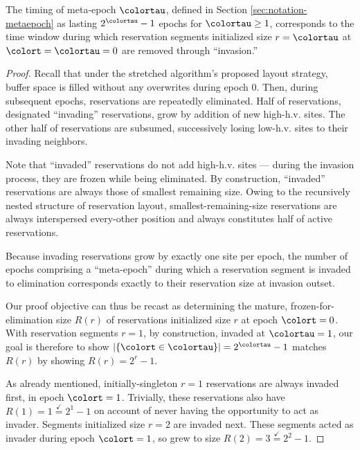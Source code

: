 \begin{lemma}
\label{thm:stretched-meta-epoch}

The timing of meta-epoch $\colortau$, defined in Section \ref{sec:notation-metaepoch} as lasting $2^{\colortau} - 1$ epochs for $\colortau\geq1$, corresponds to the time window during which reservation segments initialized size $r=\colortau$ at $\colort=\colortau=0$ are removed through ``invasion.''
\end{lemma}

\begin{proof}

Recall that under the stretched algorithm's proposed layout strategy, buffer space is filled without any overwrites during epoch 0.
Then, during subsequent epochs, reservations are repeatedly eliminated.
Half of reservations, designated ``invading'' reservations, grow by addition of new high-h.v. sites.
The other half of reservations are subsumed, successively losing low-h.v. sites to their invading neighbors.

Note that ``invaded'' reservations do not add high-h.v. sites --- during the invasion process, they are frozen while being eliminated.
By construction, ``invaded'' reservations are always those of smallest remaining size.
Owing to the recursively nested structure of reservation layout, smallest-remaining-size reservations are always interspersed every-other position and always constitutes half of active reservations.

Because invading reservations grow by exactly one site per epoch, the number of epochs comprising a ``meta-epoch'' during which a reservation segment is invaded to elimination corresponds exactly to their reservation size at invasion outset.

Our proof objective can thus be recast as determining the mature, frozen-for-elimination size $R(r)$ of reservations initialized size $r$ at epoch $\colort=0$.
With reservation segments $r=1$, by construction, invaded at $\colortau = 1$, our goal is therefore to show $|\{\colort \in \colortau\}| = 2^{\colortau} - 1$ matches $R(r)$ by showing $R(r) = 2^{r} - 1$.

As already mentioned, initially-singleton $r=1$ reservations are always invaded first, in epoch $\colort=1$.
Trivially, these reservations also have $R(1) = 1 \stackrel{\checkmark}{=} 2^1 - 1$ on account of never having the opportunity to act as invader.
Segments initialized size $r=2$ are invaded next.
These segments acted as invader during epoch $\colort=1$, so grew to size $R(2) = 3 \stackrel{\checkmark}{=} 2^2 - 1$.


\end{proof}
